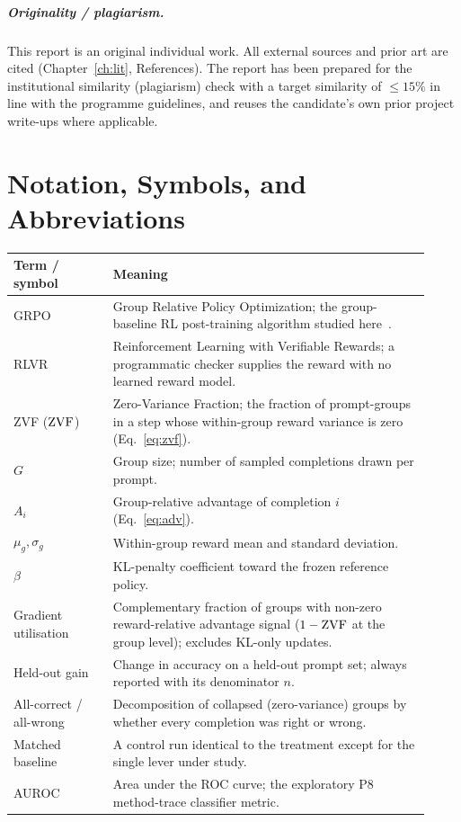 \paragraph{Originality / plagiarism.} This report is an original individual work. All
external sources and prior art are cited (Chapter~\ref{ch:lit}, References). The report
has been prepared for the institutional similarity (plagiarism) check with a target
similarity of $\le 15\%$ in line with the programme guidelines, and reuses the
candidate's own prior project write-ups where applicable.

\chapter{Notation, Symbols, and Abbreviations}
\label{app:glossary}
\small
\begin{longtable}{@{}L{0.22\linewidth}L{0.70\linewidth}@{}}
\toprule
\textbf{Term / symbol} & \textbf{Meaning} \\
\midrule
\endhead
GRPO & Group Relative Policy Optimization; the group-baseline RL post-training
algorithm studied here~\cite{shao2024deepseekmath}. \\
RLVR & Reinforcement Learning with Verifiable Rewards; a programmatic checker
supplies the reward with no learned reward model. \\
ZVF ($\mathrm{ZVF}$) & Zero-Variance Fraction; the fraction of prompt-groups in a step whose
within-group reward variance is zero (Eq.~\eqref{eq:zvf}). \\
$G$ & Group size; number of sampled completions drawn per prompt. \\
$A_i$ & Group-relative advantage of completion $i$ (Eq.~\eqref{eq:adv}). \\
$\mu_g,\sigma_g$ & Within-group reward mean and standard deviation. \\
$\beta$ & KL-penalty coefficient toward the frozen reference policy. \\
Gradient utilisation & Complementary fraction of groups with non-zero reward-relative
advantage signal ($1-\mathrm{ZVF}$ at the group level); excludes KL-only updates. \\
Held-out gain & Change in accuracy on a held-out prompt set; always reported with
its denominator $n$. \\
All-correct / all-wrong & Decomposition of collapsed (zero-variance) groups by
whether every completion was right or wrong. \\
Matched baseline & A control run identical to the treatment except for the single
lever under study. \\
AUROC & Area under the ROC curve; the exploratory P8 method-trace classifier metric. \\
\bottomrule
\end{longtable}
\normalsize
